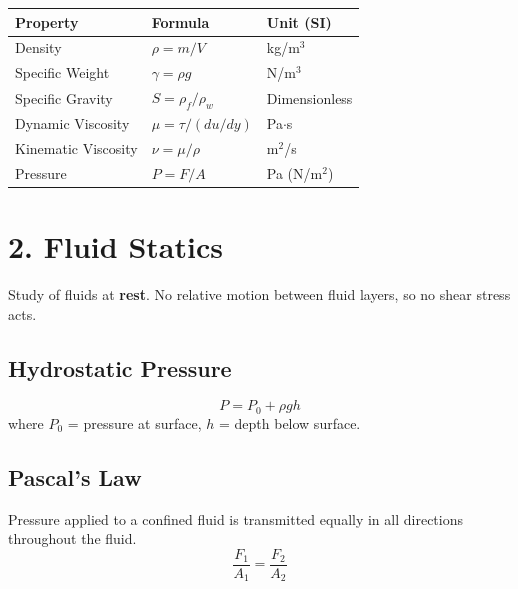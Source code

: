 \documentclass[12pt]{article}
\newcommand{\hcell}[1]{\textbf{\color{white}#1}}
\begin{document}
\begin{center}
\renewcommand{\arraystretch}{1.4}
\begin{tabular}{|C{4cm}|C{5cm}|C{4cm}|}
\hline
{}
\hcell{Property} & \hcell{Formula} & \hcell{Unit (SI)} \\
\hline
Density & $\rho = m/V$ & kg/m$^3$ \\
Specific Weight & $\gamma = \rho g$ & N/m$^3$ \\
Specific Gravity & $S = \rho_f / \rho_w$ & Dimensionless \\
Dynamic Viscosity & $\mu = \tau / (du/dy)$ & Pa$\cdot$s \\
Kinematic Viscosity & $\nu = \mu/\rho$ & m$^2$/s \\
Pressure & $P = F/A$ & Pa (N/m$^2$) \\
\hline
\end{tabular}
\end{center}

\section{2. Fluid Statics}

\begin{defbox}
Study of fluids at \textbf{rest}. No relative motion between fluid layers, so no shear stress acts.
\end{defbox}

\subsection{Hydrostatic Pressure}

\begin{formulabox}
\[
  P = P_0 + \rho g h
\]
where $P_0$ = pressure at surface, $h$ = depth below surface.
\end{formulabox}

\subsection{Pascal's Law}

\begin{thmbox}
Pressure applied to a confined fluid is transmitted equally in all directions throughout the fluid.
\[
  \frac{F_1}{A_1} = \frac{F_2}{A_2}
\]
\end{thmbox}
\end{document}
